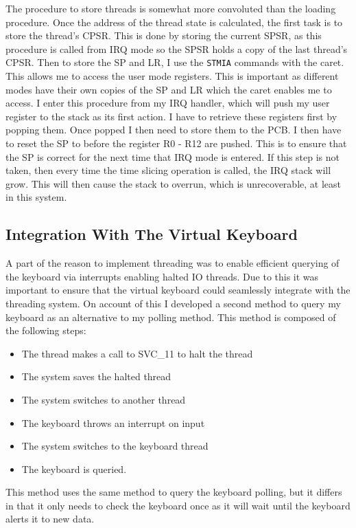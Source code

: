 The procedure to store threads is somewhat more convoluted than the loading procedure. Once the address of the thread state is calculated, the first task is to store the thread's CPSR. This is done by storing the current SPSR, as this procedure is called from IRQ mode so the SPSR holds a copy of the last thread's CPSR. Then to store the SP and LR, I use the \verb|STMIA| commands with the caret. This allows me to access the user mode registers. This is important as different modes have their own copies of the SP and LR which the caret enables me to access. I enter this procedure from my IRQ handler, which will push my user register to the stack as its first action. I have to retrieve these registers first by popping them. Once popped I then need to store them to the PCB. I then have to reset the SP to before the register R0 - R12 are pushed. This is  to ensure that the SP is correct for the next time that IRQ mode is entered. If this step is not taken, then every time the time slicing operation is called, the IRQ stack will grow. This will then cause the stack to overrun, which is unrecoverable, at least in this system.


\subsection{Integration With The Virtual Keyboard}
A part of the reason to implement threading was to enable efficient querying of the keyboard via interrupts enabling halted IO threads. Due to this it was important to ensure that the virtual keyboard could seamlessly integrate with the threading system. On account of this I developed a second method to query my keyboard as an alternative to my polling method. This method is composed of the following steps:

\begin{itemize}
	\item The thread makes a call to SVC\_11 to halt the thread
	\item The system saves the halted thread
	\item The system switches to another thread
	\item The keyboard throws an interrupt on input
	\item The system switches to the keyboard thread
	\item The keyboard is queried.
\end{itemize}
This method uses the same method to query the keyboard polling, but it differs in that it only needs to check the keyboard once as it will wait until the keyboard alerts it to new data. 

